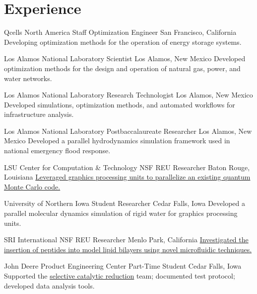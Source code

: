 \section{Experience}
		{Qcells North America}
		{Staff Optimization Engineer}
		{San Francisco, California}{}
		{Developing optimization methods for the operation of energy storage systems.}

		{Los Alamos National Laboratory}
		{Scientist}
		{Los Alamos, New Mexico}{}
		{Developed optimization methods for the design and operation of natural gas, power, and water networks.}

		{Los Alamos National Laboratory}
		{Research Technologist}
		{Los Alamos, New Mexico}{}
		{Developed simulations, optimization methods, and automated workflows for infrastructure analysis.}

		{Los Alamos National Laboratory}
		{Postbaccalaureate Researcher}
		{Los Alamos, New Mexico}{}
		{Developed a parallel hydrodynamics simulation framework used in national emergency flood response.}

		{LSU Center for Computation \& Technology}
		{NSF REU Researcher}
		{Baton Rouge, Louisiana}{}
		{\href{http://www.institute.loni.org/lasigma/package/vmc/}{Leveraged graphics processing units to parallelize an existing quantum Monte Carlo code.}}

		{University of Northern Iowa}
		{Student Researcher}
		{Cedar Falls, Iowa}{}
		{Developed a parallel molecular dynamics simulation of rigid water for graphics processing units.}

		{SRI International}
		{NSF REU Researcher}
		{Menlo Park, California}{}
		{\href{https://www.sri.com/wp-content/uploads/2019/12/sri-reu-2011-2.pdf}{Investigated the insertion of peptides into model lipid bilayers using novel microfluidic techniques.}}

		{John Deere Product Engineering Center}
		{Part-Time Student}
		{Cedar Falls, Iowa}{}
		{Supported the \href{https://www.deere.com/en/campaigns/engines-and-drivetrain/diesel-engine-technology}{selective catalytic reduction} team; documented test protocol; developed data analysis tools.}

